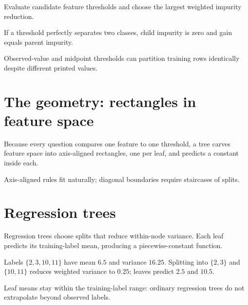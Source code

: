 Evaluate candidate feature thresholds and choose the largest weighted impurity reduction.

If a threshold perfectly separates two classes, child impurity is zero and gain equals parent impurity.

\begin{libnote}
Observed-value and midpoint thresholds can partition training rows identically despite different printed values.
\end{libnote}

\section{The geometry: rectangles in feature space}

Because every question compares one feature to one threshold, a tree carves feature space into axis-aligned rectangles, one per leaf, and predicts a constant inside each.

\begin{mlfigure}
\end{mlfigure}

Axis-aligned rules fit naturally; diagonal boundaries require staircases of splits.

\section{Regression trees}

Regression trees choose splits that reduce within-node variance. Each leaf predicts its training-label mean, producing a piecewise-constant function.

\begin{workedexample}
Labels $\{2,3,10,11\}$ have mean $6.5$ and variance $16.25$. Splitting into $\{2,3\}$ and $\{10,11\}$ reduces weighted variance to $0.25$; leaves predict $2.5$ and $10.5$.
\end{workedexample}

Leaf means stay within the training-label range: ordinary regression trees do not extrapolate beyond observed labels.

